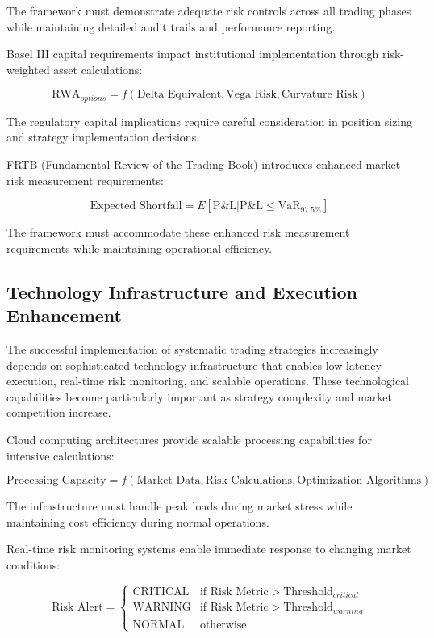\documentclass[
  american,
  11pt,
  11pt,
  letterpaper,
  onecolumn]{article}
\begin{document}
The framework must demonstrate adequate risk controls across all trading
phases while maintaining detailed audit trails and performance
reporting.

Basel III capital requirements impact institutional implementation
through risk-weighted asset calculations:

\[\text{RWA}_{options} = f(\text{Delta Equivalent}, \text{Vega Risk}, \text{Curvature Risk})\]

The regulatory capital implications require careful consideration in
position sizing and strategy implementation decisions.

FRTB (Fundamental Review of the Trading Book) introduces enhanced market
risk measurement requirements:

\[\text{Expected Shortfall} = E[\text{P\&L} | \text{P\&L} \leq \text{VaR}_{97.5\%}]\]

The framework must accommodate these enhanced risk measurement
requirements while maintaining operational efficiency.

\subsection{Technology Infrastructure and Execution
Enhancement}\label{technology-infrastructure-and-execution-enhancement}

The successful implementation of systematic trading strategies
increasingly depends on sophisticated technology infrastructure that
enables low-latency execution, real-time risk monitoring, and scalable
operations. These technological capabilities become particularly
important as strategy complexity and market competition increase.

Cloud computing architectures provide scalable processing capabilities
for intensive calculations:

\[\text{Processing Capacity} = f(\text{Market Data}, \text{Risk Calculations}, \text{Optimization Algorithms})\]

The infrastructure must handle peak loads during market stress while
maintaining cost efficiency during normal operations.

Real-time risk monitoring systems enable immediate response to changing
market conditions:

\[\text{Risk Alert} = \begin{cases}
\text{CRITICAL} & \text{if Risk Metric} > \text{Threshold}_{critical} \\
\text{WARNING} & \text{if Risk Metric} > \text{Threshold}_{warning} \\
\text{NORMAL} & \text{otherwise}
\end{cases}\]
\end{document}
